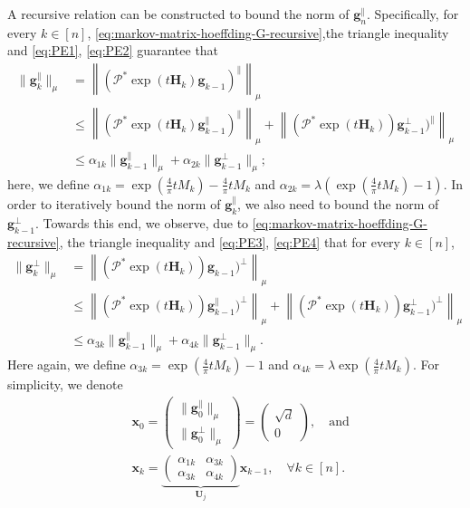 A recursive relation can be constructed to bound the norm of $\bm{g}_n^{\parallel}$. Specifically, for every $k \in [n]$, \eqref{eq:markov-matrix-hoeffding-G-recursive},the triangle inequality and \eqref{eq:PE1}, \eqref{eq:PE2} guarantee that
\begin{align*}
\|\bm{g}_k^{\parallel}\|_{\mu} &= \left\|(\mathcal{P}^* \exp(t\bm{H}_k)\bm{g}_{k-1})^{\parallel}\right\|_{\mu} \\ 
&\leq \left\|(\mathcal{P}^* \exp(t\bm{H}_k)\bm{g}_{k-1}^{\parallel})^{\parallel}\right\|_{\mu} + \left\|(\mathcal{P}^* \exp(t\bm{H}_k))\bm{g}_{k-1}^{\perp})^{\parallel}\right\|_{\mu} \\ 
&\leq \alpha_{1k} \|\bm{g}_{k-1}^{\parallel}\|_{\mu} + \alpha_{2k} \|\bm{g}_{k-1}^{\perp}\|_{\mu};
\end{align*}
here, we define $\alpha_{1k} = \exp(\frac{4}{\pi}tM_k) - \frac{4}{\pi}tM_k$ and $\alpha_{2k} = \lambda(\exp(\frac{4}{\pi}tM_k)-1)$. In order to iteratively bound the norm of $\bm{g}_k^{\parallel}$, we also need to bound the norm of $\bm{g}_{k-1}^{\perp}$. Towards this end, we observe, due to \eqref{eq:markov-matrix-hoeffding-G-recursive}, the triangle inequality and \eqref{eq:PE3}, \eqref{eq:PE4} that for every $k \in [n]$,
\begin{align*}
\|\bm{g}_k^{\perp}\|_{\mu} &= \left\|(\mathcal{P}^* \exp(t\bm{H}_k))\bm{g}_{k-1})^{\perp}\right\|_{\mu} \\ 
&\leq \left\|(\mathcal{P}^* \exp(t\bm{H}_k))\bm{g}_{k-1}^{\parallel})^{\perp}\right\|_{\mu} + \left\|(\mathcal{P}^* \exp(t\bm{H}_k))\bm{g}_{k-1}^{\perp})^{\perp}\right\|_{\mu} \\ 
&\leq \alpha_{3k} \|\bm{g}_{k-1}^{\parallel}\|_{\mu} + \alpha_{4k} \|\bm{g}_{k-1}^{\perp}\|_{\mu}.
\end{align*}
Here again, we define $\alpha_{3k} = \exp(\frac{4}{\pi}tM_k) - 1$ and $\alpha_{4k} = \lambda \exp(\frac{4}{\pi}tM_k)$. For simplicity, we denote
\begin{align*}
&\bm{x}_0 = \begin{pmatrix}
\|\bm{g}_0^{\parallel}\|_{\mu} \\ 
\|\bm{g}_0^{\perp}\|_{\mu} 
\end{pmatrix}=\begin{pmatrix}
\sqrt{d} \\ 
0
\end{pmatrix}, \quad \text{and} \\ 
&\bm{x}_k = \underset{\bm{U}_j}{\underbrace{\begin{pmatrix}
\alpha_{1k} & \alpha_{3k} \\ 
\alpha_{3k} & \alpha_{4k}
\end{pmatrix}}} \bm{x}_{k-1}, \quad \forall k \in [n].
\end{align*}
